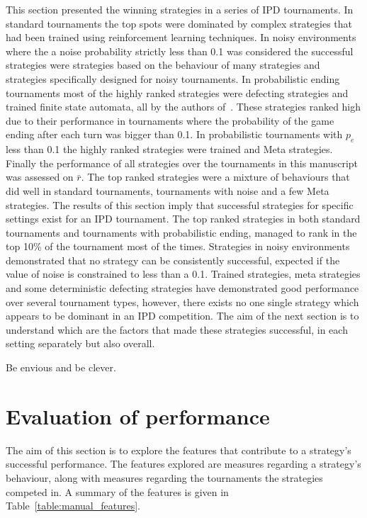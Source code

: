 \documentclass{article}
\newcommand{\numberofalltournaments}{}
\newcommand{\numberofstrategies}{}
\begin{document}
This section presented the winning strategies in a series of IPD tournaments. In
standard tournaments the top spots were dominated by complex strategies that had
been trained using reinforcement learning techniques. In noisy environments where
the a noise probability strictly less than 0.1 was considered the successful
strategies were strategies based on the behaviour of many strategies and strategies
specifically designed for noisy tournaments. In
probabilistic ending tournaments most of the highly ranked strategies were defecting
strategies and trained finite state automata, all by the authors of~\cite{Ashlock2006, Ashlock2014}.
These strategies ranked high due to their performance in tournaments where the probability of the game ending after
each turn was bigger than 0.1. In probabilistic tournaments with \(p_e\) less than 0.1
the highly ranked strategies were trained and Meta strategies.
Finally the performance of all \numberofstrategies
strategies over the \numberofalltournaments tournaments in this manuscript was
assessed on \(\bar{r}\). The top ranked strategies were a mixture of behaviours
that did well in standard tournaments, tournaments with noise and a
few Meta strategies.
The results of this section imply that successful strategies for specific
settings exist for an IPD tournament. The top ranked strategies in both standard
tournaments and tournaments with probabilistic ending, managed to rank in the
top 10\% of the tournament most of the times.
Strategies in noisy
environments demonstrated that no strategy can be consistently
successful, expected if the value of noise is constrained to less than a 0.1.
Trained strategies, meta strategies and some deterministic defecting strategies
have demonstrated good performance over several tournament types, however,
there exists no one single strategy which appears to be dominant in an IPD
competition. The aim of the next section is to understand which are
the factors that made these strategies successful, in each setting separately
but also overall.

Be envious and be clever.

\section{Evaluation of performance}\label{section:evaluation_of_performance}

The aim of this section is to explore the features that contribute to a
strategy's successful performance. The features explored are measures regarding a
strategy's behaviour, along with measures regarding the tournaments the
strategies competed in. A summary of the features is given in
Table~\ref{table:manual_features}.
\end{document}
